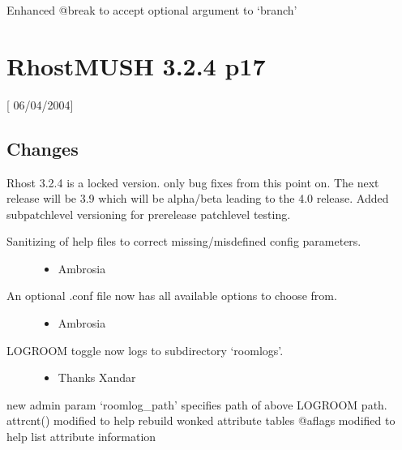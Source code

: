 \documentclass[letterpaper,10pt,english]{sphinxmanual}
\begin{document}
\sphinxAtStartPar
Enhanced @break to accept optional argument to ‘branch’


\section{RhostMUSH 3.2.4 p17}
\label{\detokenize{changelog:rhostmush-3-2-4-p17}}\label{\detokenize{changelog:changelog-3-2-4p17}}
\sphinxAtStartPar
{[} 06/04/2004{]}


\subsection{Changes}
\label{\detokenize{changelog:id4}}
\sphinxAtStartPar
Rhost 3.2.4 is a locked version.  only bug fixes from this point on.  The next release will be 3.9 which will be alpha/beta leading to the 4.0 release.
Added sub\sphinxhyphen{}patchlevel versioning for pre\sphinxhyphen{}release patchlevel testing.
\begin{description}
\item[{Sanitizing of help files to correct missing/misdefined config parameters.}] \leavevmode\begin{itemize}
\item {} 
\sphinxAtStartPar
Ambrosia

\end{itemize}

\item[{An optional .conf file now has all available options to choose from.}] \leavevmode\begin{itemize}
\item {} 
\sphinxAtStartPar
Ambrosia

\end{itemize}

\item[{LOGROOM toggle now logs to subdirectory ‘roomlogs’.}] \leavevmode\begin{itemize}
\item {} 
\sphinxAtStartPar
Thanks Xandar

\end{itemize}

\end{description}

\sphinxAtStartPar
new admin param ‘roomlog\_path’ specifies path of above LOGROOM path.
attrcnt() modified to help rebuild wonked attribute tables
@aflags modified to help list attribute information
\end{document}
